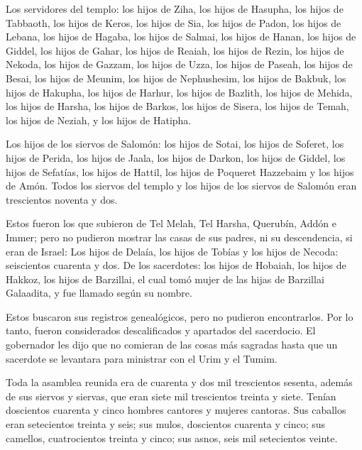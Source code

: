  Los servidores del templo: los hijos de Ziha, los hijos
de Hasupha, los hijos de Tabbaoth,  los hijos de Keros,
los hijos de Sia, los hijos de Padon,  los hijos de
Lebana, los hijos de Hagaba, los hijos de Salmai,  los
hijos de Hanan, los hijos de Giddel, los hijos de Gahar, 
los hijos de Reaiah, los hijos de Rezin, los hijos de Nekoda,
 los hijos de Gazzam, los hijos de Uzza, los hijos de
Paseah,  los hijos de Besai, los hijos de Meunim, los
hijos de Nephushesim,  los hijos de Bakbuk, los hijos de
Hakupha, los hijos de Harhur,  los hijos de Bazlith, los
hijos de Mehida, los hijos de Harsha,  los hijos de
Barkos, los hijos de Sisera, los hijos de Temah,  los
hijos de Neziah, y los hijos de Hatipha.

 Los hijos de los siervos de Salomón: los hijos de Sotai,
los hijos de Soferet, los hijos de Perida,  los hijos de
Jaala, los hijos de Darkon, los hijos de Giddel,  los
hijos de Sefatías, los hijos de Hattil, los hijos de Poqueret Hazzebaim
y los hijos de Amón.  Todos los siervos del templo y los
hijos de los siervos de Salomón eran trescientos noventa y dos.

 Estos fueron los que subieron de Tel Melah, Tel Harsha,
Querubín, Addón e Immer; pero no pudieron mostrar las casas de sus
padres, ni su descendencia, si eran de Israel:  Los hijos
de Delaía, los hijos de Tobías y los hijos de Necoda: seiscientos
cuarenta y dos.  De los sacerdotes: los hijos de Hobaiah,
los hijos de Hakkoz, los hijos de Barzillai, el cual tomó mujer de las
hijas de Barzillai Galaadita, y fue llamado según su nombre.

 Estos buscaron sus registros genealógicos, pero no
pudieron encontrarlos. Por lo tanto, fueron considerados descalificados
y apartados del sacerdocio.  El gobernador les dijo que
no comieran de las cosas más sagradas hasta que un sacerdote se
levantara para ministrar con el Urim y el Tumim.

 Toda la asamblea reunida era de cuarenta y dos mil
trescientos sesenta,  además de sus siervos y siervas,
que eran siete mil trescientos treinta y siete. Tenían doscientos
cuarenta y cinco hombres cantores y mujeres cantoras. 
Sus caballos eran setecientos treinta y seis; sus mulos, doscientos
cuarenta y cinco;  sus camellos, cuatrocientos treinta y
cinco; sus asnos, seis mil setecientos veinte.

